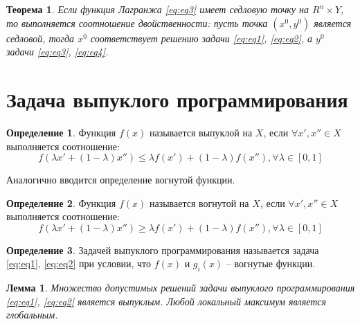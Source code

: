 \documentclass[12pt,a4paper,titlepage,oneside]{book}
\theoremstyle{definition}
\newtheorem{definition}{Определение}[chapter]
\theoremstyle{plain}
\newtheorem{theorem}{Теорема}[chapter]
\theoremstyle{remark}
\theoremstyle{remark}
\theoremstyle{plain}
\newtheorem{lemma}{Лемма}[chapter]
\theoremstyle{plain}
\begin{document}
\begin{theorem} \label{teor:teor1}
Если функция Лагранжа \eqref{eq:eq3} имеет седловую точку на $\textit{R}^n \times Y$, то выполняется соотношение двойственности: пусть точка $(x^0,y^0)$ является седловой, тогда $x^0$ соответствует решению задачи \eqref{eq:eq1}, \eqref{eq:eq2}, а $y^0$ задачи \eqref{eq:eq3}, \eqref{eq:eq4}.

\end{theorem}

\section{Задача выпуклого программирования}

\begin{definition}
Функция $f(x)$ называется выпуклой на $X$, если $\forall x',x'' \in X$ выполняется соотношение:
$$f(\lambda x' + (1-\lambda)x'') \leqslant \lambda f(x') + (1-\lambda) f(x''), \forall \lambda \in [0,1]$$
\end{definition}

Аналогично вводится определение вогнутой функции.

\begin{definition}
	Функция $f(x)$ называется вогнутой на $X$, если $\forall x',x'' \in X$ выполняется соотношение:
	$$f(\lambda x' + (1-\lambda)x'') \geqslant \lambda f(x') + (1-\lambda) f(x''), \forall \lambda \in [0,1]$$
\end{definition}

\begin{definition}
Задачей выпуклого программирования называется задача \eqref{eq:eq1}, \eqref{eq:eq2} при условии, что $f(x)$ и $g_i(x)$ -- вогнутые функции.
\end{definition}

\begin{lemma}
Множество допустимых решений задачи выпуклого программирования \ref{eq:eq1}, \ref{eq:eq2} является выпуклым. Любой локальный максимум является глобальным.
\end{lemma}
\end{document}
